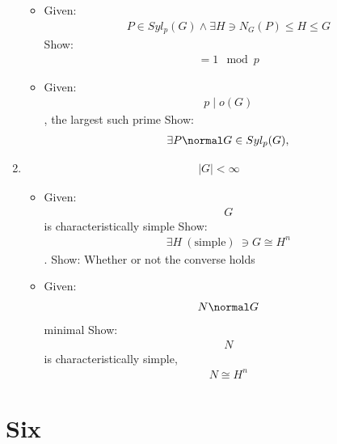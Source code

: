 \begin{enumerate}
  \begin{itemize}
  \tightlist
  \item
    Given: \begin{align*}
    P \in Syl_p(G) \wedge \exists H \ni N_G(P) \leq H \leq G\end{align*}
     Show: \begin{align*}
    [G:H] = 1 \mod p\end{align*}
  \item
    Given: \begin{align*}
    p \mid o(G)\end{align*}
    , the largest such prime Show: \begin{align*}
    \exists P \normal G \in Syl_p(G),\end{align*}
  \end{itemize}
\item
  \begin{align*}
  |G| < \infty\end{align*}

  \begin{itemize}
  \tightlist
  \item
    Given: \begin{align*}
    G\end{align*}
     is characteristically simple Show: \begin{align*}
    \exists H~(\text{simple})~ \ni G \cong H^n\end{align*}
    . Show: Whether or not the converse holds
  \item
    Given: \begin{align*}
    N \normal G\end{align*}
     minimal Show: \begin{align*}
    N\end{align*}
     is characteristically simple, \begin{align*}
    N \cong H^n\end{align*}
  \end{itemize}
\end{enumerate}

\hypertarget{six}{%
\section{Six}\label{six}}

